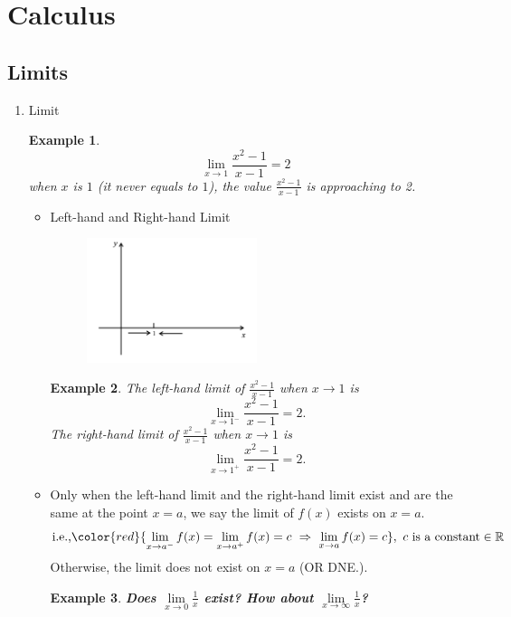 \documentclass[12pt, a4paper]{article}
\newtheorem{example}{Example}[subsection]
\begin{document}
\newpage
\section{Calculus}
\subsection{Limits}
\begin{enumerate}
    \item Limit
    \begin{example}
        $$\lim_{x\rightarrow 1}\frac{x^2-1}{x-1}=2$$
        when $x$ is {\color{red}{approaching to}} $1$ (it never equals to $1$), the value $\frac{x^2-1}{x-1}$ is approaching to 2.
    \end{example}
    \begin{itemize}
        \item Left-hand and Right-hand Limit 
        \begin{figure}[H]
            \centering 
            \includegraphics[width=0.5\textwidth]{Fig.5.1.jpg} 
        \end{figure}
        \begin{example}
            The left-hand limit of $\frac{x^2-1}{x-1}$ when $x \rightarrow 1$ is $$\lim_{x \rightarrow 1^-}\frac{x^2-1}{x-1}=2.$$
            The right-hand limit of $\frac{x^2-1}{x-1}$ when $x \rightarrow 1$ is $$\lim_{x \rightarrow 1^+}\frac{x^2-1}{x-1}=2.$$
        \end{example}
        \item Only when the left-hand limit and the right-hand limit exist and are the same at the point $x=a$, we say the limit of $f(x)$ exists on $x=a$. 
        $$\text{i.e.,}{\color{red}{\lim_{x\rightarrow a^-}f(x)=\lim_{x\rightarrow a^+}f(x)=c\ \Rightarrow\ \lim_{x\rightarrow a}f(x)=c}},\ c\text{ is a constant}\in \mathbb{R}$$
        Otherwise, the limit does not exist on $x=a$ {\color{green}(OR DNE.)}.
        \begin{example}
            \textbf{Does $\lim\limits_{x\rightarrow 0}\frac{1}{x}$ exist? How about $\lim\limits_{x\rightarrow \infty}\frac{1}{x}$?}

\end{example}
\end{itemize}
\end{enumerate}
\end{document}
